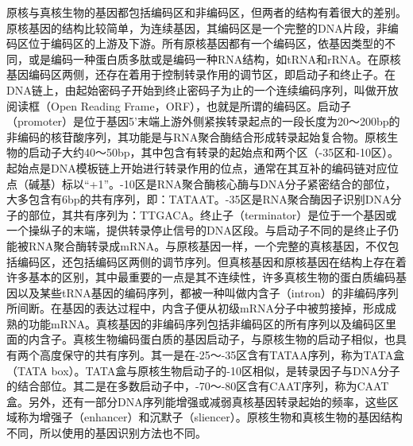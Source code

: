 原核与真核生物的基因都包括编码区和非编码区，但两者的结构有着很大的差别。原核基因的结构比较简单，为连续基因，其编码区是一个完整的DNA片段，非编码区位于编码区的上游及下游。所有原核基因都有一个编码区，依基因类型的不同，或是编码一种蛋白质多肽或是编码一种RNA结构，如tRNA和rRNA。在原核基因编码区两侧，还存在着用于控制转录作用的调节区，即启动子和终止子。在DNA链上，由起始密码子开始到终止密码子为止的一个连续编码序列，叫做开放阅读框（Open Reading Frame，ORF），也就是所谓的编码区。启动子（promoter）是位于基因5'末端上游外侧紧挨转录起点的一段长度为20～200bp的非编码的核苷酸序列，其功能是与RNA聚合酶结合形成转录起始复合物。原核生物的启动子大约40～50bp，其中包含有转录的起始点和两个区（-35区和-10区）。起始点是DNA模板链上开始进行转录作用的位点，通常在其互补的编码链对应位点（碱基）标以“+1”。-10区是RNA聚合酶核心酶与DNA分子紧密结合的部位，大多包含有6bp的共有序列，即：TATAAT。-35区是RNA聚合酶因子识别DNA分子的部位，其共有序列为：TTGACA。终止子（terminator）是位于一个基因或一个操纵子的末端，提供转录停止信号的DNA区段。与启动子不同的是终止子仍能被RNA聚合酶转录成mRNA。与原核基因一样，一个完整的真核基因，不仅包括编码区，还包括编码区两侧的调节序列。但真核基因和原核基因在结构上存在着许多基本的区别，其中最重要的一点是其不连续性，许多真核生物的蛋白质编码基因以及某些tRNA基因的编码序列，都被一种叫做内含子（intron）的非编码序列所间断。在基因的表达过程中，内含子便从初级mRNA分子中被剪接掉，形成成熟的功能mRNA。真核基因的非编码序列包括非编码区的所有序列以及编码区里面的内含子。真核生物编码蛋白质的基因启动子，与原核生物的启动子相似，也具有两个高度保守的共有序列。其一是在-25～-35区含有TATAA序列，称为TATA盒（TATA box）。TATA盒与原核生物启动子的-10区相似，是转录因子与DNA分子的结合部位。其二是在多数启动子中，-70～-80区含有CAAT序列，称为CAAT盒。另外，还有一部分DNA序列能增强或减弱真核基因转录起始的频率，这些区域称为增强子（enhancer）和沉默子（sliencer）。原核生物和真核生物的基因结构不同，所以使用的基因识别方法也不同。

